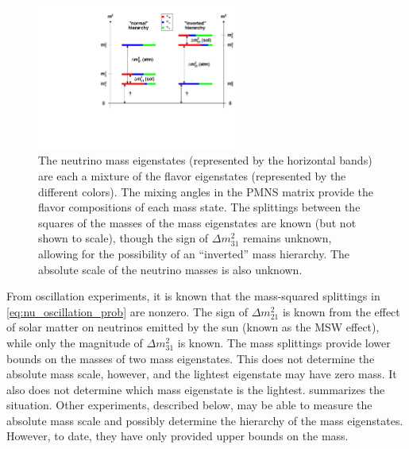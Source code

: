 \documentclass[herrin-thesis.tex]{subfiles}
\begin{document}
\begin{figure}[htp]
	\centering
	\includegraphics[width=0.6\textwidth]{./plots/nu_mixing.pdf}
	\caption[Neutrino mixing]{The neutrino mass eigenstates (represented by the horizontal bands) are each a mixture of the flavor eigenstates (represented by the different colors). The mixing angles in the PMNS matrix provide the flavor compositions of each mass state. The splittings between the squares of the masses of the mass eigenstates are known (but not shown to scale), though the sign of \(\Delta m_{31}^2\) remains unknown, allowing for the possibility of an ``inverted'' mass hierarchy. The absolute scale of the neutrino masses is also unknown.}
	\label{fig:nu_mixing}
\end{figure}

From oscillation experiments, it is known that the mass-squared splittings in \cref{eq:nu_oscillation_prob} are nonzero. The sign of \(\Delta m_{21}^2\) is known from the effect of solar matter on neutrinos emitted by the sun (known as the MSW effect), while only the magnitude of \(\Delta m_{31}^2\) is known. The mass splittings provide lower bounds on the masses of two mass eigenstates. This does not determine the absolute mass scale, however, and the lightest eigenstate may have zero mass. It also does not determine which mass eigenstate is the lightest.  summarizes the situation. Other experiments, described below, may be able to measure the absolute mass scale and possibly determine the hierarchy of the mass eigenstates. However, to date, they have only provided upper bounds on the mass.
\end{document}
